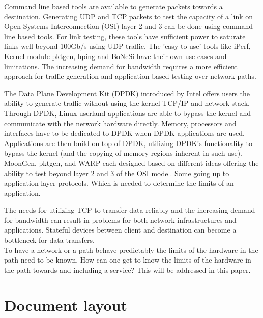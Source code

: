 Command line based tools are available to generate packets towards a destination. 
Generating UDP and TCP packets to test the capacity of a link on Open Systems Interconnection (OSI) layer 2 and 3 can be done using command line based tools. 
For link testing, these tools have sufficient power to saturate links well beyond 100Gb/s using UDP traffic. 
The 'easy to use' tools like iPerf\cite{iperf}, Kernel module pktgen\cite{pktgen-kernel}, hping\cite{hping} and BoNeSi\cite{bonesi} have their own use cases and limitations.
The increasing demand for bandwidth requires a more efficient approach for traffic generation and application based testing over network paths.

The Data Plane Development Kit\cite{dpdk} (DPDK) introduced by Intel offers users the ability to generate traffic without using the kernel TCP/IP and network stack.  
Through DPDK, Linux userland applications are able to bypass the kernel and communicate with the network hardware directly. Memory, processors and interfaces have to be dedicated to DPDK  when DPDK applications are used.
Applications are then build on top of DPDK, utilizing DPDK's functionality to bypass the kernel (and the copying of memory regions inherent in such use). MoonGen\cite{moongen}, pktgen\cite{pktgen-dpdk}, and WARP\cite{warp} each designed based on different ideas offering the ability to test beyond layer 2 and 3 of the OSI model.
Some going up to application layer protocols. Which is needed to determine the limits of an application.

The needs for utilizing TCP to transfer data reliably and the increasing demand for bandwidth can result in problems for both network infrastructures and applications. 
Stateful devices between client and destination can become a bottleneck for data transfers.\\ 
To have a network or a path behave predictably the limits of the hardware in the path need to be known.
How can one get to know the limits of the hardware in the path towards and including a service?
This will be addressed in this paper.

\section{Document layout}\label{sec:layout}

